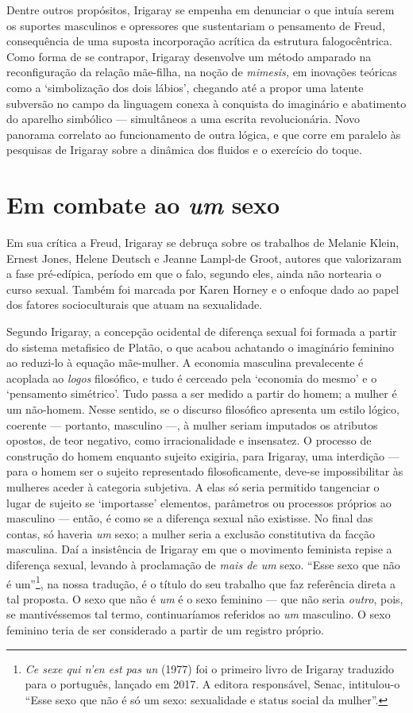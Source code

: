 Dentre outros propósitos, Irigaray se empenha em denunciar o que intuía
serem os suportes masculinos e opressores que sustentariam o pensamento
de Freud, consequência de uma suposta incorporação acrítica da estrutura
falogocêntrica. Como forma de se contrapor, Irigaray desenvolve um
método amparado na reconfiguração da relação mãe-filha, na noção de
\emph{mimesis,} em inovações teóricas como a `simbolização dos dois
lábios', chegando até a propor uma latente subversão no campo da
linguagem conexa à conquista do imaginário e abatimento do aparelho
simbólico --- simultâneos a uma escrita revolucionária. Novo panorama
correlato ao funcionamento de outra lógica, e que corre em paralelo às
pesquisas de Irigaray sobre a dinâmica dos fluidos e o exercício do
toque.

\section{Em combate ao \emph{um} sexo}

Em sua crítica a Freud, Irigaray se debruça sobre os trabalhos de
Melanie Klein, Ernest Jones, Helene Deutsch e Jeanne Lampl-de Groot,
autores que valorizaram a fase pré-edípica, período em que o falo,
segundo eles, ainda não nortearia o curso sexual. Também foi marcada por
Karen Horney e o enfoque dado ao papel dos fatores socioculturais que
atuam na sexualidade.

Segundo Irigaray, a concepção ocidental de diferença sexual foi formada
a partir do sistema metafisico de Platão, o que acabou achatando o
imaginário feminino ao reduzi-lo à equação mãe-mulher. A economia
masculina prevalecente é acoplada ao \emph{logos} filosófico, e tudo é
cerceado pela `economia do mesmo' e o `pensamento simétrico'. Tudo passa
a ser medido a partir do homem; a mulher é um não-homem. Nesse sentido,
se o discurso filosófico apresenta um estilo lógico, coerente ---
portanto, masculino ---, à mulher seriam imputados os atributos opostos,
de teor negativo, como irracionalidade e insensatez. O processo de
construção do homem enquanto sujeito exigiria, para Irigaray, uma
interdição --- para o homem ser o sujeito representado filosoficamente,
deve-se impossibilitar às mulheres aceder à categoria subjetiva. A elas
só seria permitido tangenciar o lugar de sujeito se `importasse'
elementos, parâmetros ou processos próprios ao masculino --- então, é
como se a diferença sexual não existisse. No final das contas, só
haveria \emph{um} sexo; a mulher seria a exclusão constitutiva da facção
masculina. Daí a insistência de Irigaray em que o movimento feminista
repise a diferença sexual, levando à proclamação de \emph{mais de um}
sexo. ``Esse sexo que não é um''\footnote{\emph{Ce sexe qui n'en est pas
  un} (1977) foi o primeiro livro de Irigaray traduzido para o
  português, lançado em 2017. A editora responsável, Senac, intitulou-o
  ``Esse sexo que não é só um sexo: sexualidade e status social da
  mulher''.}, na nossa tradução, é o título do seu trabalho que faz
referência direta a tal proposta. O sexo que não é \emph{um} é o sexo
feminino --- que não seria \emph{outro}, pois, se mantivéssemos tal
termo, continuaríamos referidos ao \emph{um} masculino. O sexo feminino
teria de ser considerado a partir de um registro próprio.

